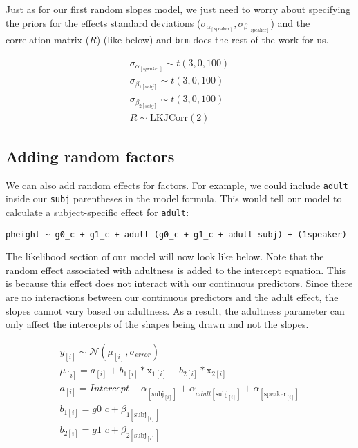 \documentclass[
]{book}
\begin{document}
Just as for our first random slopes model, we just need to worry about specifying the priors for the effects standard deviations (\(\sigma_{\alpha_{[\mathrm{speaker}]}}, \sigma_{\beta_{[\mathrm{speaker}]}}\)) and the correlation matrix (\(R\)) (like below) and \texttt{brm} does the rest of the work for us.

\begin{equation}
\begin{split}
\sigma_{\alpha_{[speaker]}} \sim t(3, 0, 100) \\ 
\sigma_{\beta_{1[subj]}} \sim t(3, 0, 100) \\ 
\sigma_{\beta_{2[subj]}} \sim t(3, 0, 100) \\ 
R \sim \mathrm{LKJCorr} (2)
\end{split}
\label{eq:614}
\end{equation}

\hypertarget{adding-random-factors}{%
\subsection{Adding random factors}\label{adding-random-factors}}

We can also add random effects for factors. For example, we could include \texttt{adult} inside our \texttt{subj} parentheses in the model formula. This would tell our model to calculate a subject-specific effect for \texttt{adult}:

\texttt{pheight\ \textasciitilde{}\ g0\_c\ +\ g1\_c\ +\ adult\ (g0\_c\ +\ g1\_c\ +\ adult\ \textbar{}subj)\ +\ (1\textbar{}speaker)}

The likelihood section of our model will now look like below. Note that the random effect associated with adultness is added to the intercept equation. This is because this effect does not interact with our continuous predictors. Since there are no interactions between our continuous predictors and the adult effect, the slopes cannot vary based on adultness. As a result, the adultness parameter can only affect the intercepts of the shapes being drawn and not the slopes.

\begin{equation}
\begin{split}
y_{[i]} \sim \mathcal{N}(\mu_{[i]},\sigma_{error}) \\
\mu_{[i]} = a_{[i]} + b_{1[i]} * \mathrm{x}_{1[i]} + b_{2[i]} * \mathrm{x}_{2[i]}  \\ 
a_{[i]} = Intercept + \alpha_{[\mathrm{subj}_{[i]}]} + \alpha_{adult[\mathrm{subj}_{[i]}]} + \alpha_{[\mathrm{speaker}_{[i]}]}  \\
b_{1[i]} =  g0\_c + \beta_{1{[\mathrm{subj}_{[i]}]}} \\ 
b_{2[i]} =  g1\_c + \beta_{2{[\mathrm{subj}_{[i]}]}} \\ \\
\end{split}
\label{eq:614}
\end{equation}
\end{document}
